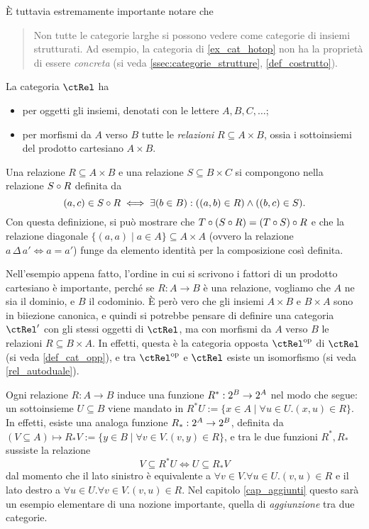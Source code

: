 \`E tuttavia estremamente importante notare che
\begin{quote}
	Non tutte le categorie larghe si possono vedere come categorie di insiemi strutturati. Ad esempio, la categoria di \ref{ex_cat_hotop} non ha la proprietà di essere \emph{concreta} (si veda \ref{ssec:categorie_strutture}, \ref{def_costrutto}).
\end{quote}
\begin{example}\label{ex_cat_rels}
	La categoria \(\ctRel\) ha
	\begin{itemize}
		\item per oggetti gli insiemi, denotati con le lettere \(A,B,C,\dots\);
		\item per morfismi da \(A\) verso \(B\) tutte le \emph{relazioni} \(R\subseteq A\times B\), ossia i sottoinsiemi del prodotto cartesiano \(A\times B\).
	\end{itemize}
	Una relazione \(R\subseteq A\times B\) e una relazione \(S\subseteq B\times C\) si compongono nella relazione \(S\circ R\) definita da
	\[(a,c)\in S\circ R\iff \exists (b\in B) : ((a,b)\in R)\land ((b,c)\in S).\]
	Con questa definizione, si può mostrare che \(T\circ(S\circ R)=(T\circ S)\circ R\) e che la relazione diagonale \(\{(a,a)\mid a\in A\}\subseteq A\times A\) (ovvero la relazione \(a\,\Delta\,a'\iff a=a'\)) funge da elemento identità per la composizione così definita.
\end{example}
Nell'esempio appena fatto, l'ordine in cui si scrivono i fattori di un prodotto cartesiano è importante, perché se \(R : A\to B\) è una relazione, vogliamo che \(A\) ne sia il dominio, e \(B\) il codominio. \`E però vero che gli insiemi \(A\times B\) e \(B\times A\) sono in biiezione canonica, e quindi si potrebbe pensare di definire una categoria \(\ctRel'\) con gli stessi oggetti di \(\ctRel\), ma con morfismi da \(A\) verso \(B\) le relazioni \(R\subseteq B\times A\). In effetti, questa è la categoria opposta \(\ctRel^\op\) di \(\ctRel\) (si veda \ref{def_cat_opp}), e tra \(\ctRel^\op\) e \(\ctRel\) esiste un isomorfismo (si veda \ref{rel_autoduale}).
\begin{remark}\label{klext_delle_relazioni}
	Ogni relazione \(R : A\to B\) induce una funzione \(R^* : 2^{B}\to 2^{A}\) nel modo che segue: un sottoinsieme \(U\subseteq B\) viene mandato in \(R^*U:=\{x\in A\mid \forall u\in U.(x,u)\in R\}\). In effetti, esiste una analoga funzione \(R_* : 2^{A}\to 2^{B}\), definita da \((V\subseteq A) \mapsto R_*V:= \{y\in B\mid \forall v\in V.(v,y)\in R\}\), e tra le due funzioni \(R^*, R_*\) sussiste la relazione
	\[V\subseteq R^*U \iff U\subseteq R_*V\label{aggiunti_in_disguise}\]
	dal momento che il lato sinistro è equivalente a \(\forall v\in V.\forall u\in U.(v,u)\in R\) e il lato destro a \(\forall u\in U.\forall v\in V.(v,u)\in R\). Nel capitolo \ref{cap_aggiunti} questo sarà un esempio elementare di una nozione importante, quella di \emph{aggiunzione} tra due categorie.
\end{remark}
